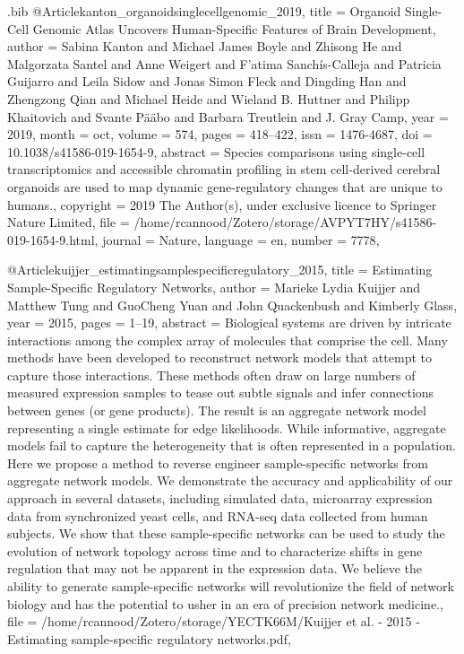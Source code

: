 \documentclass[
  table,
  10pt,
  a4paper]{article}
\begin{document}
\begin{filecontents}{\jobname.bib}
@Article{kanton_organoidsinglecellgenomic_2019,
	title = {Organoid Single-Cell Genomic Atlas Uncovers Human-Specific Features of Brain Development},
	author = {Sabina Kanton and Michael James Boyle and Zhisong He and Malgorzata Santel and Anne Weigert and F{\a'a}tima Sanch\'is-Calleja and Patricia Guijarro and Leila Sidow and Jonas Simon Fleck and Dingding Han and Zhengzong Qian and Michael Heide and Wieland B. Huttner and Philipp Khaitovich and Svante P{\"a}{{\"a}}bo and Barbara Treutlein and J. Gray Camp},
	year = {2019},
	month = {oct},
	volume = {574},
	pages = {418--422},
	issn = {1476-4687},
	doi = {10.1038/s41586-019-1654-9},
	abstract = {Species comparisons using single-cell transcriptomics and accessible chromatin profiling in stem cell-derived cerebral organoids are used to map dynamic gene-regulatory changes that are unique to humans.},
	copyright = {2019 The Author(s), under exclusive licence to Springer Nature Limited},
	file = {/home/rcannood/Zotero/storage/AVPYT7HY/s41586-019-1654-9.html},
	journal = {Nature},
	language = {en},
	number = {7778},
}

@Article{kuijjer_estimatingsamplespecificregulatory_2015,
	title = {Estimating Sample-Specific Regulatory Networks},
	author = {Marieke Lydia Kuijjer and Matthew Tung and GuoCheng Yuan and John Quackenbush and Kimberly Glass},
	year = {2015},
	pages = {1--19},
	abstract = {Biological systems are driven by intricate interactions among the complex array of molecules that comprise the cell. Many methods have been developed to reconstruct network models that attempt to capture those interactions. These methods often draw on large numbers of measured expression samples to tease out subtle signals and infer connections between genes (or gene products). The result is an aggregate network model representing a single estimate for edge likelihoods. While informative, aggregate models fail to capture the heterogeneity that is often represented in a population. Here we propose a method to reverse engineer sample-specific networks from aggregate network models. We demonstrate the accuracy and applicability of our approach in several datasets, including simulated data, microarray expression data from synchronized yeast cells, and RNA-seq data collected from human subjects. We show that these sample-specific networks can be used to study the evolution of network topology across time and to characterize shifts in gene regulation that may not be apparent in the expression data. We believe the ability to generate sample-specific networks will revolutionize the field of network biology and has the potential to usher in an era of precision network medicine.},
	file = {/home/rcannood/Zotero/storage/YECTK66M/Kuijjer et al. - 2015 - Estimating sample-specific regulatory networks.pdf},
}


\end{filecontents}
\end{document}
